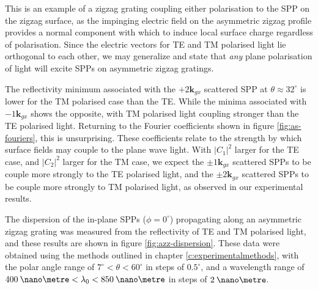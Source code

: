 This is an example of a zigzag grating coupling either polarisation to the SPP on the zigzag surface, as the impinging electric field on the asymmetric zigzag profile provides a normal component with which to induce local surface charge regardless of polarisation. Since the electric vectors for TE and TM polarised light lie orthogonal to each other, we may generalize and state that \textit{any} plane polarisation of light will excite SPPs on asymmetric zigzag gratings.

The reflectivity minimum associated with the $+2\mathbf{k}_{gx}$ scattered SPP at $\theta\approx 32^\circ$ is lower for the TM polarised case than the TE. While the minima associated with $-1\mathbf{k}_{gx}$ shows the opposite, with TM polarised light coupling stronger than the TE polarised light. Returning to the Fourier coefficients shown in figure \ref{fig:as-fouriers}, this is unsurprising. These coefficients relate to the strength by which surface fields may couple to the plane wave light. With $|C_1|^2$ larger for the TE case, and $|C_2|^2$ larger for the TM case, we expect the $\pm1\mathbf{k}_{gx}$ scattered SPPs to be couple more strongly to the TE polarised light, and the $\pm2 \mathbf{k}_{gx}$ scattered SPPs to be couple more strongly to TM polarised light, as observed in our experimental results.

The dispersion of the in-plane SPPs ($\phi=0^\circ$) propagating along an asymmetric zigzag grating was measured from the reflectivity of TE and TM polarised light, and these results are shown in figure \ref{fig:azz-dispersion}. These data were obtained using the methods outlined in chapter \ref{c:experimentalmethods}, with the polar angle range of $7^\circ<\theta<60^\circ$ in steps of $0.5^\circ$, and a wavelength range of $400\:\nano\metre<\lambda_0<850\:\nano\metre$ in steps of $2\:\nano\metre$.

